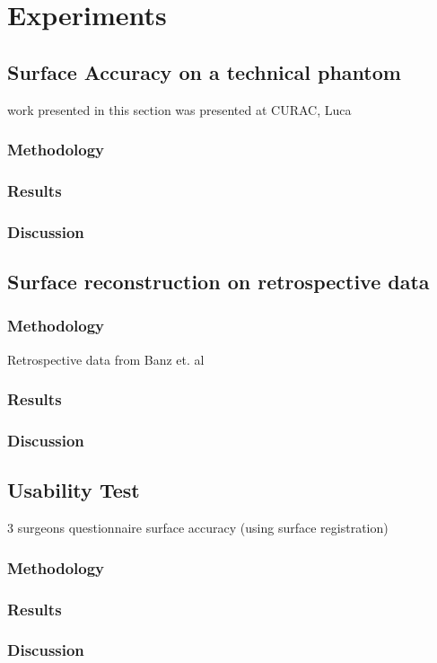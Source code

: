 \chapter{Experiments}
\section{Surface Accuracy on a technical phantom}
work presented in this section was presented at CURAC, Luca
\subsection{Methodology}
\subsection{Results}
\subsection{Discussion}

\section{Surface reconstruction on retrospective data}
\subsection{Methodology}
Retrospective data from Banz et. al
\subsection{Results}
\subsection{Discussion}

\section{Usability Test}
3 surgeons
questionnaire
surface accuracy (using surface registration)
\subsection{Methodology}
\subsection{Results}
\subsection{Discussion}
